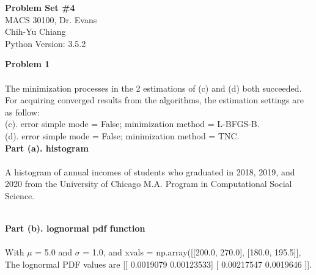 \documentclass[letterpaper,12pt]{article}
\theoremstyle{definition}
\begin{document}
\begin{flushleft}
  \textbf{\large{Problem Set \#4}} \\
  MACS 30100, Dr. Evans \\
  Chih-Yu Chiang \\
  Python Version: 3.5.2
\end{flushleft}
\vspace{5mm}
\noindent\textbf{Problem 1} \\
\\
The minimization processes in the 2 estimations of (c) and (d) both succeeded.
For acquiring converged results from the algorithms, the estimation settings are as follow: \\
(c). error simple mode = False; minimization method = L-BFGS-B. \\
(d). error simple mode = False; minimization method = TNC. \\

\noindent\textbf{Part (a). histogram} \\
\\
A histogram of annual incomes of students who graduated in 2018, 2019, and 2020 from the University of Chicago M.A. Program in Computational Social Science. \\
\begin{figure}[htb]\centering\captionsetup{width=6.0in}
  \caption{\textbf{}}
\end{figure} \\

\noindent\textbf{Part (b). lognormal pdf function} \\
\\
With $\mu$ = 5.0 and $\sigma$ = 1.0, and xvals = np.array([[200.0, 270.0], [180.0, 195.5]], \\
The lognormal PDF values are [[ 0.0019079   0.00123533] [ 0.00217547  0.0019646 ]].
\\
\end{document}
